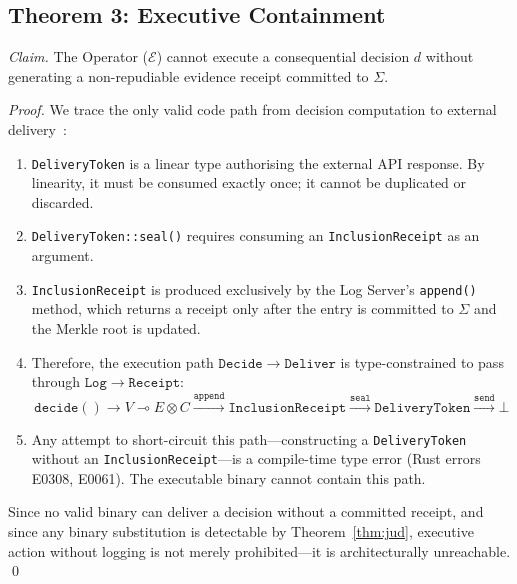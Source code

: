 \subsection{Theorem 3: Executive Containment}
\label{subsec:proof-exec}

\textit{Claim.} The Operator ($\mathcal{E}$) cannot execute a
consequential decision $d$ without generating a non-repudiable
evidence receipt committed to $\Sigma$.

\begin{proof}
We trace the only valid code path from decision computation to
external delivery~\cite{btv2026}:

\begin{enumerate}
  \item \texttt{DeliveryToken} is a linear type authorising the
  external API response. By linearity, it must be consumed exactly
  once; it cannot be duplicated or discarded.
  \item \texttt{DeliveryToken::seal()} requires consuming an
  \texttt{InclusionReceipt} as an argument.
  \item \texttt{InclusionReceipt} is produced exclusively by the
  Log Server's \texttt{append()} method, which returns a receipt only
  after the entry is committed to $\Sigma$ and the Merkle root is
  updated.
  \item Therefore, the execution path
  $\mathtt{Decide} \to \mathtt{Deliver}$ is type-constrained to pass
  through $\mathtt{Log} \to \mathtt{Receipt}$:
  \[
    \mathtt{decide}() \to V \multimap E \otimes C
    \xrightarrow{\mathtt{append}} \mathtt{InclusionReceipt}
    \xrightarrow{\mathtt{seal}} \mathtt{DeliveryToken}
    \xrightarrow{\mathtt{send}} \bot
  \]
  \item Any attempt to short-circuit this path---constructing a
  \texttt{DeliveryToken} without an \texttt{InclusionReceipt}---is a
  compile-time type error (Rust errors E0308, E0061). The
  executable binary cannot contain this path.
\end{enumerate}

Since no valid binary can deliver a decision without a committed
receipt, and since any binary substitution is detectable by
Theorem~\ref{thm:jud}, executive action without logging is not merely
prohibited---it is architecturally unreachable. \qed
\end{proof}

